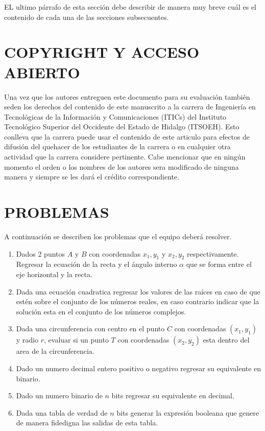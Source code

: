 \documentclass{IEEEcsmag}
\begin{document}
EL ultimo párrafo de esta sección debe describir de manera muy breve cuál es el contenido de cada una de las secciones subsecuentes.



\section{COPYRIGHT Y ACCESO ABIERTO}

Una vez que los autores entreguen este documento para su evaluación también seden los derechos del contenido de este manuscrito a la carrera de Ingeniería en Tecnológicas de la Información y Comunicaciones (ITICs) del Instituto Tecnológico Superior del Occidente del Estado de Hidalgo (ITSOEH). Esto conlleva que la carrera puede usar el contenido de este articulo para efectos de difusión del quehacer de los estudiantes de la carrera o en cualquier otra actividad que la carrera considere pertinente. Cabe mencionar que en ningún momento el orden o los nombres de los autores sera modificado de ninguna manera y siempre se les dará el crédito correspondiente. 

\section{PROBLEMAS}
A continuación se describen los problemas que el equipo deberá resolver.

\begin{enumerate}
\item Dados 2 puntos $A \mbox{ y } B$ con coordenadas $x_{1}, y_{1}$ y $x_{2}, y_{2}$  respectivamente. Regresar la ecuación de la recta y el ángulo interno $\alpha$ que se forma entre el eje horizontal y la recta. 
\item Dada una ecuación cuadratica regresar los valores de las raíces en caso de que estén sobre el conjunto de los números reales, en caso contrario indicar que la solución esta en el conjunto de los números complejos. 
\item Dada una circunferencia con centro en el punto $C$ con coordenadas $(x_{1}, y_{1})$ y radio $r$, evaluar si un punto $T$ con coordenadas $(x_{2}, y_{2})$ esta dentro del area de la circunferencia.
\item Dado un numero decimal entero positivo o negativo regresar su equivalente en binario.
\item Dado un numero binario de $n$ bits regresar su equivalente en decimal.
\item Dada una tabla de verdad de $n$ bits generar la expresión booleana que genere de manera fidedigna las salidas de esta tabla.
\end{enumerate}
\end{document}

